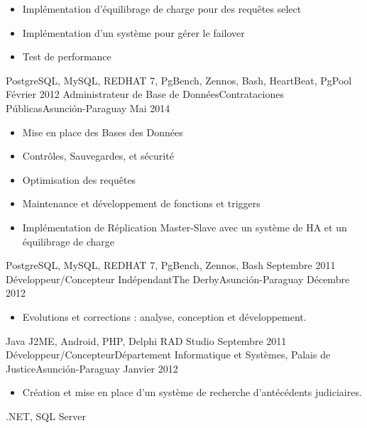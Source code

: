\begin{experiences}
{\begin{itemize}
                        \item Implémentation d'équilibrage de charge pour des requêtes select
                        \item Implémentation d'un système pour gérer le failover
                        \item  Test de performance
                      \end{itemize}
                    }
                {PostgreSQL, MySQL, REDHAT 7, PgBench, Zennos, Bash, HeartBeat, PgPool}
  \emptySeparator
  \experience
    {Février 2012}   {Administrateur de Base de Données}{Contrataciones Públicas}{Asunción-Paraguay}
    {Mai 2014} {
                      \begin{itemize}
                        \item Mise en place des Bases des Données
                        \item Contrôles, Sauvegardes, et sécurité
                        \item Optimisation des requêtes
                        \item Maintenance et développement de fonctions et triggers
                        \item Implémentation de Réplication Master-Slave avec un système de HA et un équilibrage de charge
                      \end{itemize}
				}
                {PostgreSQL, MySQL, REDHAT 7, PgBench, Zennos, Bash}
  \emptySeparator
  \experience
    {Septembre 2011}   {Développeur/Concepteur Indépendant}{The Derby}{Asunción-Paraguay}
    {Décembre 2012} {
                      \begin{itemize}
                        \item Evolutions et corrections : analyse, conception et développement.
                      \end{itemize}
				}
                {Java J2ME, Android, PHP, Delphi RAD Studio}
  \emptySeparator
  \experience
    {Septembre 2011}   {Développeur/Concepteur}{Département Informatique et Systèmes, Palais de Justice}{Asunción-Paraguay}
    {Janvier 2012} {
                      \begin{itemize}
                        \item Création et mise en place d’un système de recherche d’antécédents judiciaires.
                      \end{itemize}
				}
                {.NET, SQL Server}
  \emptySeparator
\end{experiences}
